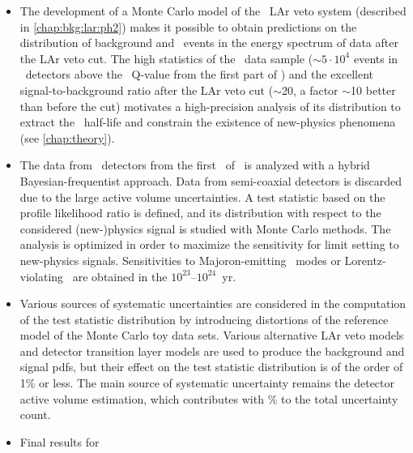 \chapsummary
\begin{itemize}
  \item The development of a Monte Carlo model of the \gerda\ LAr veto system (described
    in \cref{chap:bkg:lar:ph2}) makes it possible to obtain predictions on the
    distribution of background and \nnbb\ events in the energy spectrum of data after the
    LAr veto cut. The high statistics of the \nnbb\ data sample ($\sim$$5 \cdot 10^4$
    events in \bege\ detectors above the \Arl\ Q-value from the first part of \phasetwo)
    and the excellent signal-to-background ratio after the LAr veto cut ($\sim$20, a
    factor $\sim$10 better than before the cut) motivates a high-precision analysis of its
    distribution to extract the \nnbb\ half-life and constrain the existence of
    new-physics phenomena (see \cref{chap:theory}).
  \item The data from \bege\ detectors from the first \gexpophasetwobkg\ of \phasetwo\
    is analyzed with a hybrid Bayesian-frequentist approach. Data from semi-coaxial
    detectors is discarded due to the large active volume uncertainties. A test statistic
    based on the profile likelihood ratio is defined, and its distribution with respect to
    the considered (new-)physics signal is studied with Monte Carlo methods. The analysis
    is optimized in order to maximize the sensitivity for limit setting to new-physics
    signals. Sensitivities to Majoron-emitting \onbb\ modes or Lorentz-violating \nnbb\
    are obtained in the $10^{23}$--$10^{24}$~yr.
  \item Various sources of systematic uncertainties are considered in the computation of
    the test statistic distribution by introducing distortions of the reference model of
    the Monte Carlo toy data sets. Various alternative LAr veto models and detector
    transition layer models are used to produce the background and signal pdfs, but their
    effect on the test statistic distribution is of the order of 1\% or less. The main
    source of systematic uncertainty remains the detector active volume estimation, which
    contributes with \fillme{?}\% to the total uncertainty count.
  \item Final results for \thalftwo\ \fillme{\ldots}
\end{itemize}

